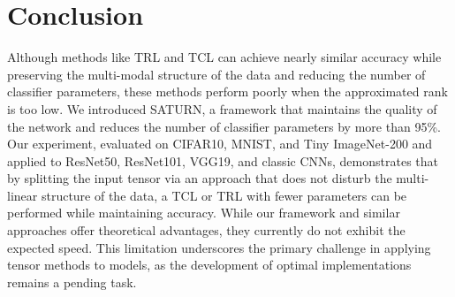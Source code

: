 \documentclass{article}
\begin{document}
	
\section{Conclusion}
\label{sec:conclusion}
Although methods like TRL and TCL can achieve nearly similar accuracy while preserving the multi-modal structure of the data and reducing the number of classifier parameters, these methods perform poorly when the approximated rank is too low. We introduced SATURN, a framework that maintains the quality of the network and reduces the number of classifier parameters by more than 95\%. Our experiment, evaluated on CIFAR10, MNIST, and Tiny ImageNet-200 and applied to ResNet50, ResNet101, VGG19, and classic CNNs, demonstrates that by splitting the input tensor via an approach that does not disturb the multi-linear structure of the data, a TCL or TRL with fewer parameters can be performed while maintaining accuracy. While our framework and similar approaches offer theoretical advantages, they currently do not exhibit the expected speed. This limitation underscores the primary challenge in applying tensor methods to models, as the development of optimal implementations remains a pending task.
\end{document}
